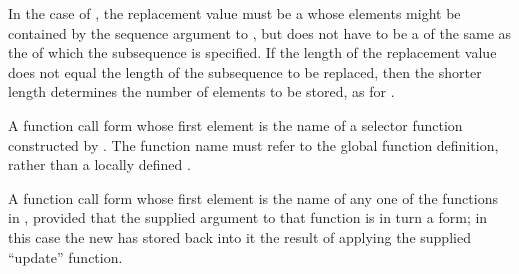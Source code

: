 In the case of , the replacement value must be a 
whose elements might be contained by the sequence argument to ,
but does not have to be a  of the same  
as the  of which the subsequence is specified.
If the length of the replacement value does not equal the length of
the subsequence to be replaced, then the shorter length determines
the number of elements to be stored, as for .

  
A function call form whose first element is the name of
a selector function constructed by .
The function name must refer to the global function definition,
rather than a locally defined .

% 
% 

\itemitem{\bull}
A function call form whose first element is the name of
any one of the functions in \thenextfigure, 
provided that the supplied argument
to that function is in turn a  form;
in this case the new  has stored back into it the
result of applying the supplied ``update'' function.

